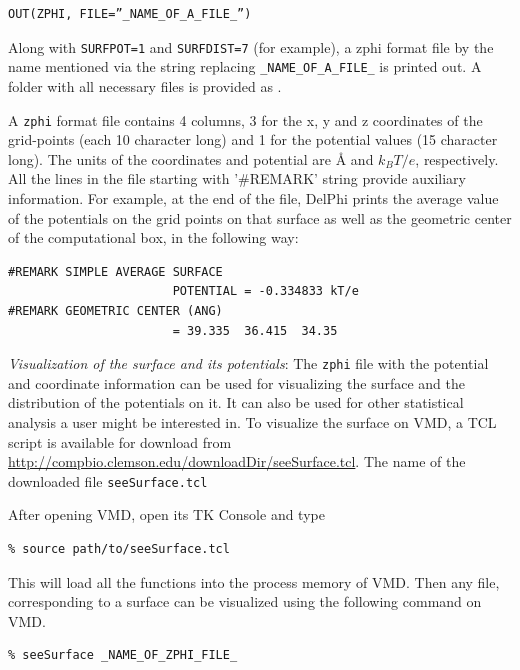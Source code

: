 \documentclass[9pt,tutorial,pubversion]{livecoms}
\newcommand*\ttvar[1]{\texttt{\expandafter\dottvar\detokenize{#1}\relax}}
\newcommand*\dottvar[1]{\ifx\relax#1\else
  \expandafter\ifx\string_#1\string_\allowbreak\else#1\fi
  \expandafter\dottvar\fi}
\begin{document}
\begin{verbatim}
OUT(ZPHI, FILE=”_NAME_OF_A_FILE_”)
\end{verbatim}

Along with \texttt{SURFPOT=1} and \texttt{SURFDIST=7} (for example), a zphi format file by the name mentioned via the string replacing \texttt{\_NAME\_OF\_A\_FILE\_} is printed out. A folder with all necessary files is provided as \ttvar{Example_3.1.3/}. 

A \texttt{zphi} format file contains 4 columns, 3 for the x, y and z coordinates of the grid-points (each 10 character long) and 1 for the potential values (15 character long). The units of the coordinates and potential are Å and $ k_BT/e $, respectively. All the lines in the file starting with '\#REMARK' string provide auxiliary information. For example, at the end of the file, DelPhi prints the average value of the potentials on the grid points on that surface as well as the geometric center of the computational box, in the following way:

\begin{verbatim}
#REMARK SIMPLE AVERAGE SURFACE 
                       POTENTIAL = -0.334833 kT/e
#REMARK GEOMETRIC CENTER (ANG)          
                       = 39.335  36.415  34.35
\end{verbatim}

\textit{Visualization of the surface and its potentials}:
The \texttt{zphi} file with the potential and coordinate information can be used for visualizing the surface and the distribution of the potentials on it. It can also be used for other statistical analysis a user might be interested in. To visualize the surface on VMD\cite{humphrey1996vmd}, a TCL script is available for download from \url{http://compbio.clemson.edu/downloadDir/seeSurface.tcl}. The name of the downloaded file \texttt{seeSurface.tcl}

After opening VMD, open its TK Console and type

\begin{verbatim}
% source path/to/seeSurface.tcl
\end{verbatim}

This will load all the functions into the process memory of VMD\cite{humphrey1996vmd}. Then any file, corresponding to a surface can be visualized using the following command on VMD.

\begin{verbatim}
% seeSurface _NAME_OF_ZPHI_FILE_
\end{verbatim}
\end{document}
